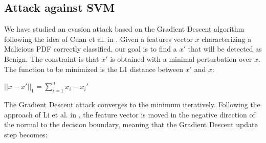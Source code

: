 \documentclass[twocolumn, switch]{article} %
\begin{document}
\subsection{Attack against SVM}
\label{subsec:svm}
We have studied an evasion attack based on the Gradient Descent algorithm following the idea of Cuan et al. in \cite{cuan_damien_delaplace_valois_2018}. Given
a features vector $x$ characterizing a Malicious PDF correctly classified, our goal is to find a $x'$ that will be detected as Benign. The constraint is that $x'$ is obtained with a minimal perturbation over $x$. The function to be minimized is the L1 distance between $x'$ and $x$:
\begin{center}
	$||x-x'||_1 = \sum_{i=1}^{d}x_i-x_i'$
\end{center}

The Gradient Descent attack converges to the minimum iteratively. Following the approach of Li et al. in \cite{li_liu_yan_yang_2022}, the feature vector is moved in the negative direction of the normal to the decision boundary, meaning that the Gradient Descent update step becomes:
\end{document}
